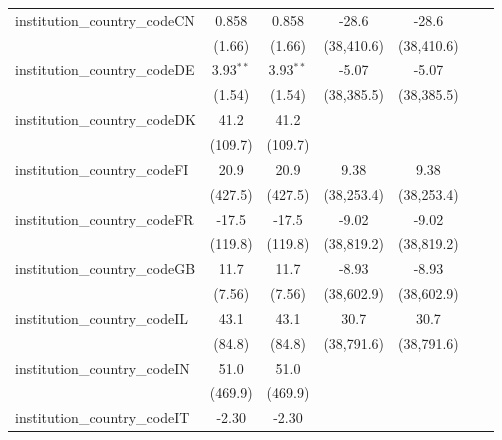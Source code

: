 \begin{tabular}{lcccccc}
   institution\_country\_codeCN          & 0.858       & 0.858       & -28.6       & -28.6       &             &   \\   
                                         & (1.66)      & (1.66)      & (38,410.6)  & (38,410.6)  &             &   \\   
   institution\_country\_codeDE          & 3.93$^{**}$ & 3.93$^{**}$ & -5.07       & -5.07       &             &   \\   
                                         & (1.54)      & (1.54)      & (38,385.5)  & (38,385.5)  &             &   \\   
   institution\_country\_codeDK          & 41.2        & 41.2        &             &             &             &   \\   
                                         & (109.7)     & (109.7)     &             &             &             &   \\   
   institution\_country\_codeFI          & 20.9        & 20.9        & 9.38        & 9.38        &             &   \\   
                                         & (427.5)     & (427.5)     & (38,253.4)  & (38,253.4)  &             &   \\   
   institution\_country\_codeFR          & -17.5       & -17.5       & -9.02       & -9.02       &             &   \\   
                                         & (119.8)     & (119.8)     & (38,819.2)  & (38,819.2)  &             &   \\   
   institution\_country\_codeGB          & 11.7        & 11.7        & -8.93       & -8.93       &             &   \\   
                                         & (7.56)      & (7.56)      & (38,602.9)  & (38,602.9)  &             &   \\   
   institution\_country\_codeIL          & 43.1        & 43.1        & 30.7        & 30.7        &             &   \\   
                                         & (84.8)      & (84.8)      & (38,791.6)  & (38,791.6)  &             &   \\   
   institution\_country\_codeIN          & 51.0        & 51.0        &             &             &             &   \\   
                                         & (469.9)     & (469.9)     &             &             &             &   \\   
   institution\_country\_codeIT          & -2.30       & -2.30       &             &             &             &   \\   

\end{tabular}
